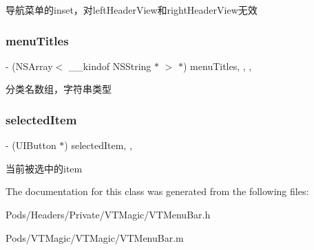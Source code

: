 导航菜单的inset，对left\+Header\+View和right\+Header\+View无效 \mbox{\label{interface_v_t_menu_bar_ac9624e7f9d49556536dba5ded9f34bb7}} 
\subsubsection{\texorpdfstring{menu\+Titles}{menuTitles}}
{\footnotesize\ttfamily -\/ (N\+S\+Array$<$ \+\_\+\+\_\+kindof N\+S\+String $\ast$ $>$ $\ast$) menu\+Titles\hspace{0.3cm}{\ttfamily [read]}, {\ttfamily [write]}, {\ttfamily [nonatomic]}, {\ttfamily [strong]}}

分类名数组，字符串类型 \mbox{\label{interface_v_t_menu_bar_aea3a7836dca15ffdca068c2d59dfe56e}} 
\subsubsection{\texorpdfstring{selected\+Item}{selectedItem}}
{\footnotesize\ttfamily -\/ (U\+I\+Button $\ast$) selected\+Item\hspace{0.3cm}{\ttfamily [read]}, {\ttfamily [nonatomic]}, {\ttfamily [strong]}}

当前被选中的item 

The documentation for this class was generated from the following files\+:\begin{DoxyCompactItemize}
\item 
Pods/\+Headers/\+Private/\+V\+T\+Magic/V\+T\+Menu\+Bar.\+h\item 
Pods/\+V\+T\+Magic/\+V\+T\+Magic/V\+T\+Menu\+Bar.\+m\end{DoxyCompactItemize}
